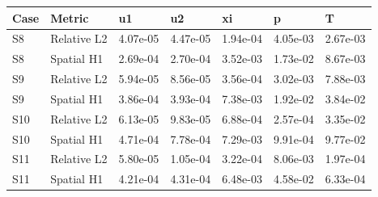 \begin{tabular}{lllllll}
\hline
Case & Metric & u1 & u2 & xi & p & T \\
\hline
S8 & Relative L2 & 4.07e-05 & 4.47e-05 & 1.94e-04 & 4.05e-03 & 2.67e-03 \\
S8 & Spatial H1 & 2.69e-04 & 2.70e-04 & 3.52e-03 & 1.73e-02 & 8.67e-03 \\
S9 & Relative L2 & 5.94e-05 & 8.56e-05 & 3.56e-04 & 3.02e-03 & 7.88e-03 \\
S9 & Spatial H1 & 3.86e-04 & 3.93e-04 & 7.38e-03 & 1.92e-02 & 3.84e-02 \\
S10 & Relative L2 & 6.13e-05 & 9.83e-05 & 6.88e-04 & 2.57e-04 & 3.35e-02 \\
S10 & Spatial H1 & 4.71e-04 & 7.78e-04 & 7.29e-03 & 9.91e-04 & 9.77e-02 \\
S11 & Relative L2 & 5.80e-05 & 1.05e-04 & 3.22e-04 & 8.06e-03 & 1.97e-04 \\
S11 & Spatial H1 & 4.21e-04 & 4.31e-04 & 6.48e-03 & 4.58e-02 & 6.33e-04 \\
\hline
\end{tabular}
